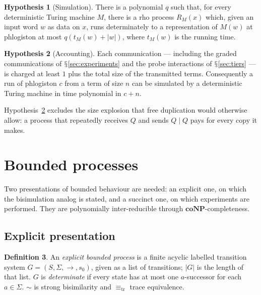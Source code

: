 \documentclass[11pt]{article}
\theoremstyle{definition}
\newtheorem{definition}{Definition}[section]
\newtheorem{hypothesis}[definition]{Hypothesis}
\theoremstyle{plain}
\theoremstyle{remark}
\newcommand{\sbisim}{\sim}
\newcommand{\treq}{\equiv_{\mathrm{tr}}}
\DeclareRobustCommand{\S}{\ifmmode\mathsection\else$\mathsection$\fi}
\newcommand{\coNP}{\mathbf{coNP}}
\begin{document}
\begin{hypothesis}[Simulation]\label{hyp:sim}
There is a polynomial $q$ such that, for every deterministic Turing
machine $M$, there is a rho process $R_M(x)$ which, given an input word
$w$ as data on $x$, runs determinately to a representation of $M(w)$ at
phlogiston at most $q(t_M(w) + |w|)$, where $t_M(w)$ is the running time.
\end{hypothesis}

\begin{hypothesis}[Accounting]\label{hyp:acct}
Each communication --- including the graded communications of
\S\ref{sec:experiments} and the probe interactions of
\S\ref{sec:tiers} --- is charged at least $1$ plus the total size of the
transmitted terms. Consequently a run of phlogiston $c$ from a term of
size $n$ can be simulated by a deterministic Turing machine in time
polynomial in $c + n$.
\end{hypothesis}

Hypothesis~\ref{hyp:acct} excludes the size explosion that free
duplication would otherwise allow: a process that repeatedly receives $Q$
and sends $Q \mid Q$ pays for every copy it makes.

\section{Bounded processes}\label{sec:bounded}

Two presentations of bounded behaviour are needed: an explicit one, on
which the bisimulation analog is stated, and a succinct one, on which
experiments are performed. They are polynomially inter-reducible through
$\coNP$-completeness.

\subsection{Explicit presentation}

\begin{definition}
An \emph{explicit bounded process} is a finite acyclic labelled
transition system $G = (S, \Sigma, \to, s_0)$, given as a list of
transitions; $|G|$ is the length of that list. $G$ is \emph{determinate}
if every state has at most one $a$-successor for each $a \in \Sigma$.
$\sbisim$ is strong bisimilarity and $\treq$ trace equivalence.
\end{definition}
\end{document}

